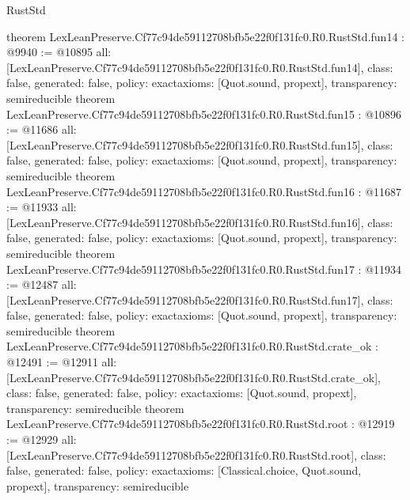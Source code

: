 \begin{lexlean}{RustStd}
\begin{coremodule}
{}
theorem LexLeanPreserve.Cf77c94de59112708bfb5e22f0f131fc0.R0.RustStd.fun14 : @9940 := @10895 {
  all: [LexLeanPreserve.Cf77c94de59112708bfb5e22f0f131fc0.R0.RustStd.fun14],
  class: false,
  generated: false,
  policy: exact{axioms: [Quot.sound, propext]},
  transparency: semireducible
}
theorem LexLeanPreserve.Cf77c94de59112708bfb5e22f0f131fc0.R0.RustStd.fun15 : @10896 := @11686 {
  all: [LexLeanPreserve.Cf77c94de59112708bfb5e22f0f131fc0.R0.RustStd.fun15],
  class: false,
  generated: false,
  policy: exact{axioms: [Quot.sound, propext]},
  transparency: semireducible
}
theorem LexLeanPreserve.Cf77c94de59112708bfb5e22f0f131fc0.R0.RustStd.fun16 : @11687 := @11933 {
  all: [LexLeanPreserve.Cf77c94de59112708bfb5e22f0f131fc0.R0.RustStd.fun16],
  class: false,
  generated: false,
  policy: exact{axioms: [Quot.sound, propext]},
  transparency: semireducible
}
theorem LexLeanPreserve.Cf77c94de59112708bfb5e22f0f131fc0.R0.RustStd.fun17 : @11934 := @12487 {
  all: [LexLeanPreserve.Cf77c94de59112708bfb5e22f0f131fc0.R0.RustStd.fun17],
  class: false,
  generated: false,
  policy: exact{axioms: [Quot.sound, propext]},
  transparency: semireducible
}
theorem LexLeanPreserve.Cf77c94de59112708bfb5e22f0f131fc0.R0.RustStd.crate_ok : @12491 := @12911 {
  all: [LexLeanPreserve.Cf77c94de59112708bfb5e22f0f131fc0.R0.RustStd.crate_ok],
  class: false,
  generated: false,
  policy: exact{axioms: [Quot.sound, propext]},
  transparency: semireducible
}
theorem LexLeanPreserve.Cf77c94de59112708bfb5e22f0f131fc0.R0.RustStd.root : @12919 := @12929 {
  all: [LexLeanPreserve.Cf77c94de59112708bfb5e22f0f131fc0.R0.RustStd.root],
  class: false,
  generated: false,
  policy: exact{axioms: [Classical.choice, Quot.sound, propext]},
  transparency: semireducible
}


\end{coremodule}
\end{lexlean}
